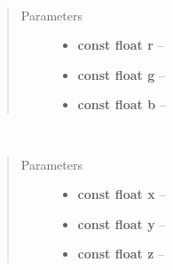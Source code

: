 \documentclass[letterpaper,10pt,english]{sphinxmanual}
\begin{document}

\begin{fulllineitems}
\label{gl:VertexData::addColor__floatC.floatC.floatC}~\begin{quote}\begin{description}
\item[{Parameters}] \leavevmode\begin{itemize}
\item {} 
\textbf{const float r} -- 

\item {} 
\textbf{const float g} -- 

\item {} 
\textbf{const float b} -- 

\end{itemize}

\end{description}\end{quote}

\end{fulllineitems}


\begin{fulllineitems}
\label{gl:VertexData::addNormal__floatC.floatC.floatC}~\begin{quote}\begin{description}
\item[{Parameters}] \leavevmode\begin{itemize}
\item {} 
\textbf{const float x} -- 

\item {} 
\textbf{const float y} -- 

\item {} 
\textbf{const float z} -- 

\end{itemize}

\end{description}\end{quote}

\end{fulllineitems}

\end{document}
